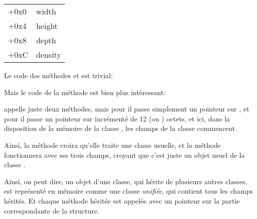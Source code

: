 \begin{center}
\begin{tabular}{ | l | l | }
\hline
  \tableheader{} \\
\hline
  +0x0 & width \\
\hline
  +0x4 & height \\
\hline
  +0x8 & depth \\
\hline
  +0xC & density \\
\hline
\end{tabular}
\end{center}


Le code des méthodes  et  est trivial:






Mais le code de la méthode  est bien plus intéressant:




 appelle juste deux méthodes, mais pour  il passe
simplement un pointeur sur , et pour  il passe un pointeur
sur  incrémenté de 12 (ou ) octets, et ici, dans la disposition
de la mémoire de la classe , les champs de la classe 
commencent.


Ainsi, la méthode  croira qu'elle traite une classe
 usuelle, et la méthode  fonctionnera avec
ses trois champs, croyant que c'est juste un objet usuel de la classe .


Ainsi, on peut dire, un objet d'une classe, qui hérite de plusieurs autres classes,
est représenté en mémoire comme une classe \emph{unifiée}, qui contient tous les champs
hérités.
Et chaque méthode héritée est appelée avec un pointeur sur la partie correspondante
de la structure.

